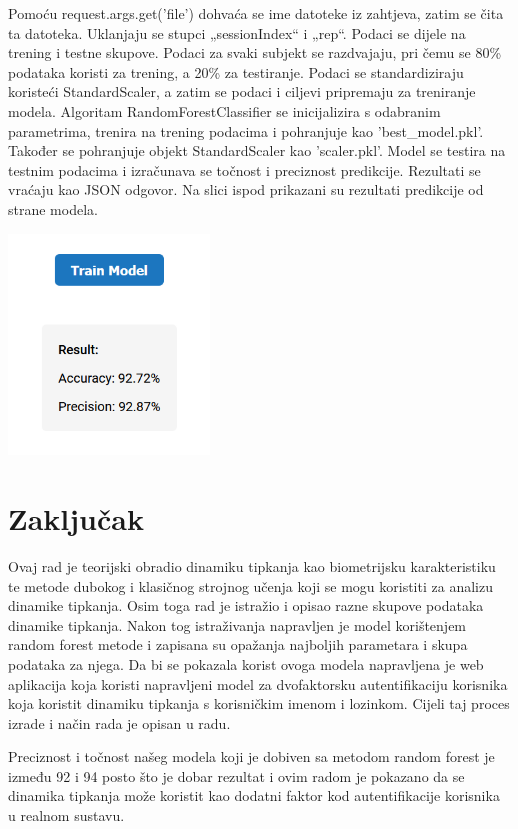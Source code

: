 \documentclass[]{foi}
\begin{document}
Pomoću request.args.get('file') dohvaća se ime datoteke iz zahtjeva, zatim se čita ta datoteka. Uklanjaju se stupci „sessionIndex“ i „rep“. Podaci se dijele na trening i testne skupove. Podaci za svaki subjekt se razdvajaju, pri čemu se 80\% podataka koristi za trening, a 20\% za testiranje. Podaci se standardiziraju koristeći StandardScaler, a zatim se podaci i ciljevi pripremaju za treniranje modela. Algoritam RandomForestClassifier se inicijalizira s odabranim parametrima, trenira na trening podacima i pohranjuje kao 'best\_model.pkl'. Također se pohranjuje objekt StandardScaler kao 'scaler.pkl'. Model se testira na testnim podacima i izračunava se točnost i preciznost predikcije. Rezultati se vraćaju kao JSON odgovor. Na slici ispod prikazani su rezultati predikcije od strane modela.

\begin{center}
    \includegraphics[width=0.4\textwidth]{slike/app_model_rezultati.png}
    \label{fig:app-model-rezultati}
\end{center}

\chapter{Zaključak}

Ovaj rad je teorijski obradio dinamiku tipkanja kao biometrijsku karakteristiku te metode dubokog i klasičnog strojnog učenja koji se mogu koristiti za analizu dinamike tipkanja. Osim toga rad je istražio i opisao razne skupove podataka dinamike tipkanja. Nakon tog istraživanja napravljen je model korištenjem random forest metode i zapisana su opažanja najboljih parametara i skupa podataka za njega. Da bi se pokazala korist ovoga modela napravljena je web aplikacija koja koristi napravljeni model za dvofaktorsku autentifikaciju korisnika koja koristit dinamiku tipkanja s korisničkim imenom i lozinkom. Cijeli taj proces izrade i način rada je opisan u radu. 

Preciznost i točnost našeg modela koji je dobiven sa metodom random forest je između 92 i 94 posto što je dobar rezultat i ovim radom je pokazano da se dinamika tipkanja može koristit kao dodatni faktor kod autentifikacije korisnika u realnom sustavu. 



\makebackmatter
\end{document}
